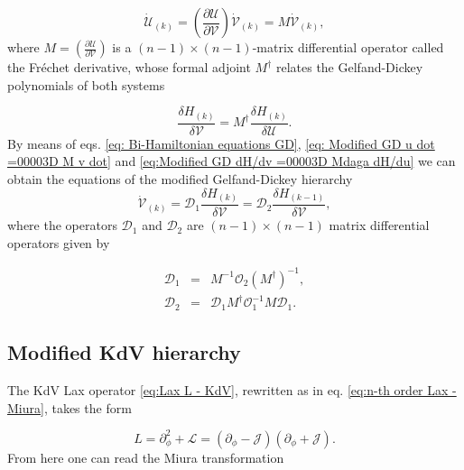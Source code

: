 \documentclass[letterpaper,11pt,oneside]{book}
\begin{document}
\begin{equation}
	\dot{\mathcal{U}}_{\left(k\right)}=\left(\frac{\partial\mathcal{U}}{\partial\mathcal{V}}\right)\dot{\mathcal{V}}_{\left(k\right)}=M\dot{\mathcal{V}}_{\left(k\right)},\label{eq: Modified GD u dot =00003D M v dot}
\end{equation}
where $M=\left(\frac{\partial\mathcal{U}}{\partial\mathcal{V}}\right)$
is a $\left(n-1\right)\times\left(n-1\right)$-matrix differential
operator called the Fréchet derivative, whose formal adjoint $M^{\dagger}$
relates the Gelfand-Dickey polynomials of both systems

\begin{equation}
	\frac{\delta H_{\left(k\right)}}{\delta\mathcal{V}}=M^{\dagger}\frac{\delta H_{\left(k\right)}}{\delta\mathcal{U}}.\label{eq:Modified GD dH/dv =00003D Mdaga dH/du}
\end{equation}
By means of eqs. \eqref{eq: Bi-Hamiltonian equations GD}, \eqref{eq: Modified GD u dot =00003D M v dot}
and \eqref{eq:Modified GD dH/dv =00003D Mdaga dH/du} we can obtain
the equations of the modified Gelfand-Dickey hierarchy
\begin{equation}
	\dot{\mathcal{V}}_{\left(k\right)}=\mathscr{D}_{1}\frac{\delta H_{\left(k\right)}}{\delta\mathcal{V}}=\mathscr{D}_{2}\frac{\delta H_{\left(k-1\right)}}{\delta\mathcal{V}},\label{eq:Bi-Hamiltonian equations mGD}
\end{equation}
where the operators $\mathscr{D}_{1}$ and $\mathscr{D}_{2}$ are
$\left(n-1\right)\times\left(n-1\right)$ matrix differential operators
given by

\begin{eqnarray}
	\mathscr{D}_{1} & = & M^{-1}\mathscr{O}_{2}\left(M^{\dagger}\right)^{-1},\label{eq:modified First Hamiltonian Op}\\
	\mathscr{D}_{2} & = & \mathscr{D}_{1}M^{\dagger}\mathscr{O}_{1}^{-1}M\mathscr{D}_{1}.\label{eq:modified Second Hamiltonian Op}
\end{eqnarray}


\subsection*{Modified KdV hierarchy }

The KdV Lax operator \eqref{eq:Lax L - KdV}, rewritten as in eq. \eqref{eq:n-th order Lax - Miura}, takes the form

\[
L=\partial_{\phi}^{2}+\mathcal{L}=\left(\partial_{\phi}-\mathcal{J}\right)\left(\partial_{\phi}+\mathcal{J}\right).
\]
From here one can read the Miura transformation
\end{document}
